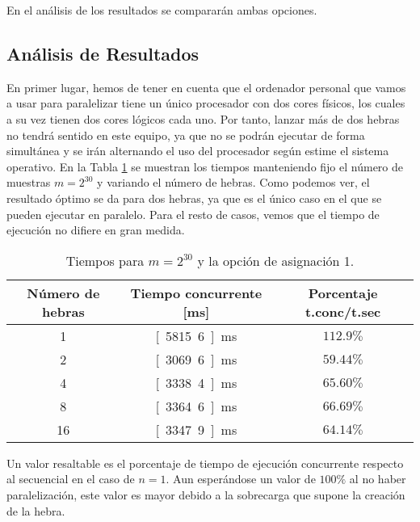 \documentclass[12pt]{book}
\begin{document}
    En el análisis de los resultados se compararán ambas opciones.

    \subsection{Análisis de Resultados}

    En primer lugar, hemos de tener en cuenta que el ordenador personal que vamos
    a usar para paralelizar tiene un único procesador con dos cores físicos, los cuales a su vez tienen
    dos cores lógicos cada uno. Por tanto, lanzar más de dos hebras no tendrá sentido en este equipo,
    ya que no se podrán ejecutar de forma simultánea y se irán alternando el uso del procesador
    según estime el sistema operativo. En la Tabla \ref{tab:dist_num_hebras} se muestran los tiempos
    manteniendo fijo el número de muestras $m=2^{30}$ y variando el número de hebras.
    Como podemos ver, el resultado óptimo se da para dos hebras, ya que es el único caso en el que se pueden ejecutar en paralelo.
    Para el resto de casos, vemos que el tiempo de ejecución no difiere en gran medida.
    \begin{table}
        \centering
        \begin{tabular}{|c|c|c|}
            \hline
            \textbf{Número de hebras} & \textbf{Tiempo concurrente [ms]} & \textbf{Porcentaje t.conc/t.sec} \\
            \hline
            1 & \unit[5815.6]{ms} & $112.9\%$ \\
            2 & \unit[3069.6]{ms} & $59.44\%$ \\
            4 & \unit[3338.4]{ms} & $65.60\%$ \\
            8 & \unit[3364.6]{ms} & $66.69\%$ \\
            16 & \unit[3347.9]{ms} & $64.14\%$ \\
            \hline
        \end{tabular}
        \caption{Tiempos para $m=2^{30}$ y la opción de asignación 1.}
        \label{tab:dist_num_hebras}
    \end{table}
    Un valor resaltable es el porcentaje de tiempo de ejecución concurrente respecto al secuencial en el caso de $n=1$.
    Aun esperándose un valor de $100\%$ al no haber paralelización, este valor es mayor debido a la sobrecarga que supone la creación de la hebra.
\end{document}
